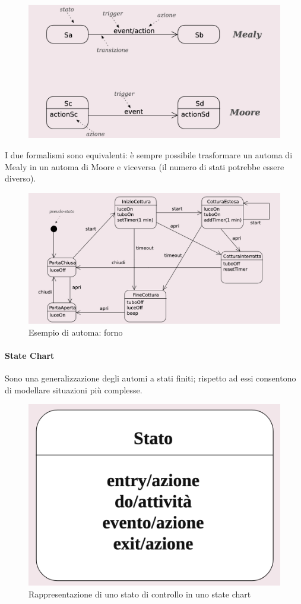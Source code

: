 \begin{figure}[H]
    \centering
    \includegraphics[width=0.75\linewidth]{assets/UML/state/state1.png}
\end{figure}

I due formalismi sono equivalenti: è sempre possibile trasformare un automa di Mealy in un automa di Moore e viceversa (il numero di stati potrebbe essere diverso).

\begin{figure}[H]
    \centering
    \includegraphics[width=0.75\linewidth]{assets/UML/state/state2.png}
    \caption{Esempio di automa: forno}
\end{figure}

\paragraph{State Chart} Sono una generalizzazione degli automi a stati finiti; rispetto ad essi consentono di modellare situazioni più complesse.

\begin{figure}[H]
    \centering
    \includegraphics[width=0.25\linewidth]{assets/UML/state/state3.png}
    \caption{Rappresentazione di uno stato di controllo in uno state chart}
\end{figure}

